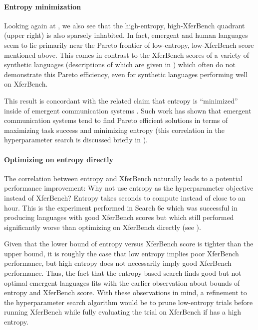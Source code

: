 \paragraph{Entropy minimization}
Looking again at , we also see that the high-entropy, high-XferBench quadrant (upper right) is also sparsely inhabited.
In fact, emergent and human languages seem to lie primarily near the Pareto frontier of low-entropy, low-XferBench score mentioned above.
This comes in contrast to the XferBench scores of a variety of synthetic languages (descriptions of which are given in ) which often do not demonstrate this Pareto efficiency, even for synthetic languages performing well on XferBench.

This result is concordant with the related claim that entropy is ``minimized'' inside of emergent communication systems \citep{kharitonov2020entmin,chaabouni2021color}.
Such work has shown that emergent communication systems tend to find Pareto efficient solutions in terms of maximizing task success and minimizing entropy (this correlation in the hyperparameter search is discussed briefly in ).


\paragraph{Optimizing on entropy directly}
The correlation between entropy and XferBench naturally leads to a potential performance improvement: Why not use entropy as the hyperparameter objective instead of XferBench?
Entropy takes seconds to compute instead of close to an hour.
This is the experiment performed in Search 6e which was successful in producing languages with good XferBench scores but which still performed significantly worse than optimizing on XferBench directly (see ).

Given that the lower bound of entropy versus XferBench score is tighter than the upper bound, it is roughly the case that low entropy implies poor XferBench performance, but high entropy does not necessarily imply good XferBench performance.
Thus, the fact that the entropy-based search finds good but not optimal emergent languages fits with the earlier observation about bounds of entropy and XferBench score.
With these observations in mind, a refinement to the hyperparameter search algorithm would be to prune low-entropy trials before running XferBench while fully evaluating the trial on XferBench if has a high entropy.


